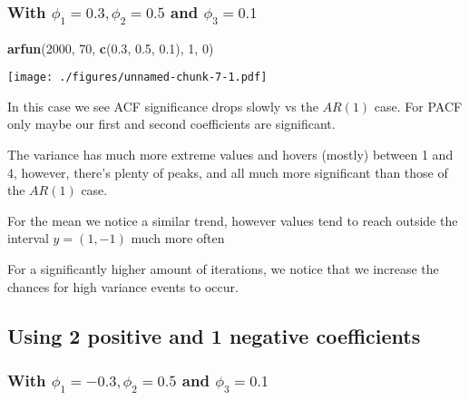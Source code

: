 \documentclass[]{article}
\newenvironment{Shaded}{\begin{snugshade}}{\end{snugshade}}
\newcommand{\DecValTok}[1]{\textcolor[rgb]{0.00,0.00,0.81}{#1}}
\newcommand{\FloatTok}[1]{\textcolor[rgb]{0.00,0.00,0.81}{#1}}
\newcommand{\KeywordTok}[1]{\textcolor[rgb]{0.13,0.29,0.53}{\textbf{#1}}}
\newcommand{\NormalTok}[1]{#1}
\begin{document}
\hypertarget{with-phi_1-0.3-phi_2-0.5-and-phi_3-0.1}{%
\subsubsection{\texorpdfstring{With \(\phi_1 = 0.3, \phi_2 = 0.5\) and
\(\phi_3 = 0.1\)}{With \textbackslash{}phi\_1 = 0.3, \textbackslash{}phi\_2 = 0.5 and \textbackslash{}phi\_3 = 0.1}}\label{with-phi_1-0.3-phi_2-0.5-and-phi_3-0.1}}

\begin{Shaded}
\begin{Highlighting}[]
\KeywordTok{arfun}\NormalTok{(}\DecValTok{2000}\NormalTok{, }\DecValTok{70}\NormalTok{, }\KeywordTok{c}\NormalTok{(}\FloatTok{0.3}\NormalTok{, }\FloatTok{0.5}\NormalTok{, }\FloatTok{0.1}\NormalTok{), }\DecValTok{1}\NormalTok{, }\DecValTok{0}\NormalTok{)}
\end{Highlighting}
\end{Shaded}

\texttt{[image: ./figures/unnamed-chunk-7-1.pdf]}

In this case we see ACF significance drops slowly vs the \(AR(1)\) case.
For PACF only maybe our first and second coefficients are significant.

The variance has much more extreme values and hovers (mostly) between 1
and 4, however, there's plenty of peaks, and all much more significant
than those of the \(AR(1)\) case.

For the mean we notice a similar trend, however values tend to reach
outside the interval \(y = (1,-1)\) much more often

For a significantly higher amount of iterations, we notice that we
increase the chances for high variance events to occur.

\hypertarget{using-2-positive-and-1-negative-coefficients}{%
\subsection{Using 2 positive and 1 negative
coefficients}\label{using-2-positive-and-1-negative-coefficients}}

\hypertarget{with-phi_1--0.3-phi_2-0.5-and-phi_3-0.1}{%
\subsubsection{\texorpdfstring{With \(\phi_1 = -0.3, \phi_2 = 0.5\) and
\(\phi_3 = 0.1\)}{With \textbackslash{}phi\_1 = -0.3, \textbackslash{}phi\_2 = 0.5 and \textbackslash{}phi\_3 = 0.1}}\label{with-phi_1--0.3-phi_2-0.5-and-phi_3-0.1}}
\end{document}
